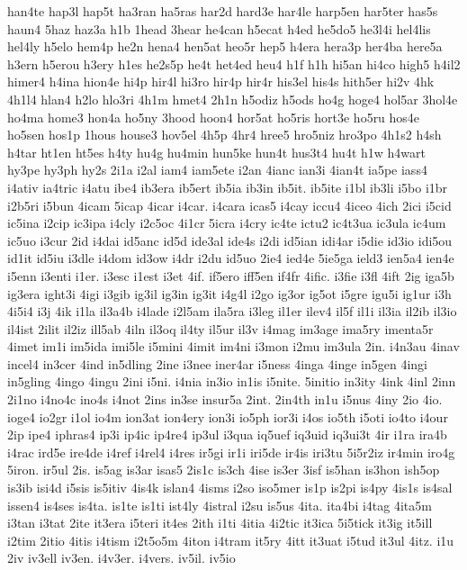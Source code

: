 {han4te
hap3l
hap5t
ha3ran
ha5ras
har2d
hard3e
har4le
harp5en
har5ter
has5s
haun4
5haz
haz3a
h1b
1head
3hear
he4can
h5ecat
h4ed
he5do5
he3l4i
hel4lis
hel4ly
h5elo
hem4p
he2n
hena4
hen5at
heo5r
hep5
h4era
hera3p
her4ba
here5a
h3ern
h5erou
h3ery
h1es
he2s5p
he4t
het4ed
heu4
h1f
h1h
hi5an
hi4co
high5
h4il2
himer4
h4ina
hion4e
hi4p
hir4l
hi3ro
hir4p
hir4r
his3el
his4s
hith5er
hi2v
4hk
4h1l4
hlan4
h2lo
hlo3ri
4h1m
hmet4
2h1n
h5odiz
h5ods
ho4g
hoge4
hol5ar
3hol4e
ho4ma
home3
hon4a
ho5ny
3hood
hoon4
hor5at
ho5ris
hort3e
ho5ru
hos4e
ho5sen
hos1p
1hous
house3
hov5el
4h5p
4hr4
hree5
hro5niz
hro3po
4h1s2
h4sh
h4tar
ht1en
ht5es
h4ty
hu4g
hu4min
hun5ke
hun4t
hus3t4
hu4t
h1w
h4wart
hy3pe
hy3ph
hy2s
2i1a
i2al
iam4
iam5ete
i2an
4ianc
ian3i
4ian4t
ia5pe
iass4
i4ativ
ia4tric
i4atu
ibe4
ib3era
ib5ert
ib5ia
ib3in
ib5it.
ib5ite
i1bl
ib3li
i5bo
i1br
i2b5ri
i5bun
4icam
5icap
4icar
i4car.
i4cara
icas5
i4cay
iccu4
4iceo
4ich
2ici
i5cid
ic5ina
i2cip
ic3ipa
i4cly
i2c5oc
4i1cr
5icra
i4cry
ic4te
ictu2
ic4t3ua
ic3ula
ic4um
ic5uo
i3cur
2id
i4dai
id5anc
id5d
ide3al
ide4s
i2di
id5ian
idi4ar
i5die
id3io
idi5ou
id1it
id5iu
i3dle
i4dom
id3ow
i4dr
i2du
id5uo
2ie4
ied4e
5ie5ga
ield3
ien5a4
ien4e
i5enn
i3enti
i1er.
i3esc
i1est
i3et
4if.
if5ero
iff5en
if4fr
4ific.
i3fie
i3fl
4ift
2ig
iga5b
ig3era
ight3i
4igi
i3gib
ig3il
ig3in
ig3it
i4g4l
i2go
ig3or
ig5ot
i5gre
igu5i
ig1ur
i3h
4i5i4
i3j
4ik
i1la
il3a4b
i4lade
i2l5am
ila5ra
i3leg
il1er
ilev4
il5f
il1i
il3ia
il2ib
il3io
il4ist
2ilit
il2iz
ill5ab
4iln
il3oq
il4ty
il5ur
il3v
i4mag
im3age
ima5ry
imenta5r
4imet
im1i
im5ida
imi5le
i5mini
4imit
im4ni
i3mon
i2mu
im3ula
2in.
i4n3au
4inav
incel4
in3cer
4ind
in5dling
2ine
i3nee
iner4ar
i5ness
4inga
4inge
in5gen
4ingi
in5gling
4ingo
4ingu
2ini
i5ni.
i4nia
in3io
in1is
i5nite.
5initio
in3ity
4ink
4inl
2inn
2i1no
i4no4c
ino4s
i4not
2ins
in3se
insur5a
2int.
2in4th
in1u
i5nus
4iny
2io
4io.
ioge4
io2gr
i1ol
io4m
ion3at
ion4ery
ion3i
io5ph
ior3i
i4os
io5th
i5oti
io4to
i4our
2ip
ipe4
iphras4
ip3i
ip4ic
ip4re4
ip3ul
i3qua
iq5uef
iq3uid
iq3ui3t
4ir
i1ra
ira4b
i4rac
ird5e
ire4de
i4ref
i4rel4
i4res
ir5gi
ir1i
iri5de
ir4is
iri3tu
5i5r2iz
ir4min
iro4g
5iron.
ir5ul
2is.
is5ag
is3ar
isas5
2is1c
is3ch
4ise
is3er
3isf
is5han
is3hon
ish5op
is3ib
isi4d
i5sis
is5itiv
4is4k
islan4
4isms
i2so
iso5mer
is1p
is2pi
is4py
4is1s
is4sal
issen4
is4ses
is4ta.
is1te
is1ti
ist4ly
4istral
i2su
is5us
4ita.
ita4bi
i4tag
4ita5m
i3tan
i3tat
2ite
it3era
i5teri
it4es
2ith
i1ti
4itia
4i2tic
it3ica
5i5tick
it3ig
it5ill
i2tim
2itio
4itis
i4tism
i2t5o5m
4iton
i4tram
it5ry
4itt
it3uat
i5tud
it3ul
4itz.
i1u
2iv
iv3ell
iv3en.
i4v3er.
i4vers.
iv5il.
iv5io
}
